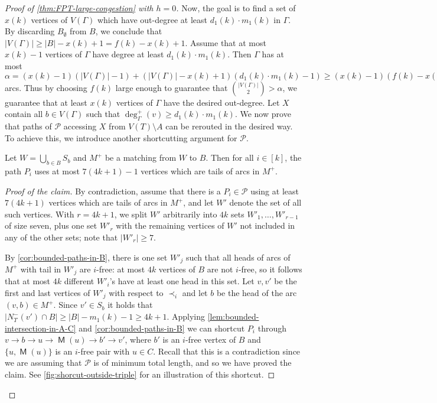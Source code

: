 \documentclass[a4paper,UKenglish,cleveref, autoref, thm-restate]{lipics-v2021}
\DeclareMathOperator{\Mat}{\mathsf M}
\begin{document}
\begin{proof}[Proof of \autoref{thm:FPT-large-congestion} with $h = 0$]
Now, the goal is to find a set of $x(k)$ vertices of $V(\Gamma)$ which have out-degree at least $d_1(k) \cdot m_1(k)$ in $\Gamma$. By discarding $B_\emptyset$ from $B$, we conclude that $|V(\Gamma)| \geq |B| - x(k)+1 = f(k) - x(k) + 1$.
Assume that at most $x(k)-1$ vertices of $\Gamma$ have degree at least $d_1(k) \cdot m_1(k)$.
Then $\Gamma$ has at most $\alpha = (x(k) - 1)(|V(\Gamma)|-1) + (|V(\Gamma)| - x(k) + 1)(d_1(k)\cdot m_1(k) - 1) \geq (x(k) - 1)(f(k)-x(k)) + (f(k) - 2x(k) + 2)(d_1(k)\cdot m_1(k) - 1)$ arcs.
Thus by choosing $f(k)$ large enough to guarantee that $\binom{|V(\Gamma)|}{2} > \alpha$, we guarantee that at least $x(k)$ vertices of $\Gamma$ have the desired out-degree.
Let $X$ contain all $b \in V(\Gamma)$ such that $\deg^+_{\Gamma}(v) \geq d_1(k) \cdot m_1(k)$.
We now prove that paths of $\mathcal{P}$ accessing $X$ from $V(T) \setminus A$ can be rerouted in the desired way.
To achieve this, we introduce another shortcutting argument for $\mathcal{P}$.



\begin{claim}\label{claim:bounded-used-outside-of-B-first-step}
Let $W = \bigcup_{b \in B} S_b$ and $M^+$ be a matching from $W$ to $B$.
Then for all $i \in [k]$, the path $P_i$ uses at most $7(4k+1)-1$ vertices which are tails of arcs in $M^+$.
\end{claim}
\begin{proof}[Proof of the claim] By contradiction, assume that there is a $P_i \in \mathcal{P}$ using at least $7(4k+1)$ vertices which are tails of arcs in $M^+$, and let $W'$ denote the set of all such vertices.
With $r = 4k+1$, we split $W'$ arbitrarily into $4k$ sets $W'_1, \ldots, W'_{r-1}$ of size seven, plus one set $W'_r$ with the remaining vertices of $W'$ not included in any of the other sets; note that $|W'_r| \geq 7$.

By \autoref{cor:bounded-paths-in-B}, there is one set $W'_j$ such that all heads of arcs of $M^+$ with tail in $W'_j$ are $i$-free: at most $4k$ vertices of $B$ are not $i$-free, so it follows that at most $4k$ different $W'_i$'s have at least one head in this set.
Let $v, v'$ be the first and last vertices of $W'_j$ with respect to $\prec_i$ and let $b$ be the head of the arc $(v, b) \in M^+$.
Since $v' \in S_b$ it holds that $|N^-_T(v') \cap B| \geq |B| - m_1(k)-1 \geq 4k + 1$.
Applying \autoref{lem:bounded-intersection-in-A-C} and \autoref{cor:bounded-paths-in-B} we can
shortcut $P_i$ through $v \to b \to u \to \Mat(u) \to b' \to v'$, where $b'$ is an $i$-free vertex of $B$ and $\{u, \Mat(u)\}$ is an $i$-free pair with $u \in C$. Recall that this is a contradiction since we are assuming that $\mathcal{P}$ is of minimum total length, and so we have proved the claim.
See \autoref{fig:shorcut-outside-triple} for an illustration of this shortcut.
\end{proof}


\end{proof}
\end{document}
